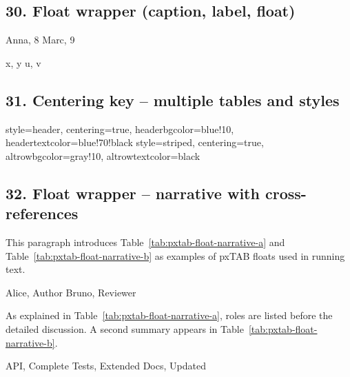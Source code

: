 \documentclass{article}
\begin{document}
\subsection*{30. Float wrapper (caption, label, float)}
  {Anna, 8}
  {Marc, 9}

  {x, y}
  {u, v}

\subsection*{31. Centering key -- multiple tables and styles}
\pxTABsetup
  {
    style=header,
    centering=true,
    headerbgcolor=blue!10,
    headertextcolor=blue!70!black
  }
%
\pxTABsetup
  {
    style=striped,
    centering=true,
    altrowbgcolor=gray!10,
    altrowtextcolor=black
  }

\subsection*{32. Float wrapper -- narrative with cross-references}
This paragraph introduces Table~\ref{tab:pxtab-float-narrative-a} and
Table~\ref{tab:pxtab-float-narrative-b} as examples of pxTAB floats used
in running text.

  {Alice, Author}
  {Bruno, Reviewer}

As explained in Table~\ref{tab:pxtab-float-narrative-a}, roles are listed
before the detailed discussion. A second summary appears in
Table~\ref{tab:pxtab-float-narrative-b}.

  {API, Complete}
  {Tests, Extended}
  {Docs, Updated}
\end{document}

